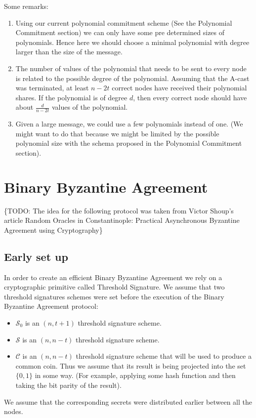 Some remarks:
\begin{enumerate}
  \item Using our current polynomial commitment scheme (See the Polynomial
    Commitment section) we can only have some pre determined sizes of
    polynomials. Hence here we should choose a minimal polynomial with degree
    larger than the size of the message. 

  \item The number of values of the polynomial that needs to be sent to every
    node is related to the possible degree of the polynomial. Assuming that
    the A-cast was terminated, at least $n-2t$ correct nodes have received their
    polynomial shares. If the polynomial is of degree $d$, then every correct
    node should have about $\frac{d}{n-2t}$ values of the polynomial.

  \item Given a large message, we could use a few polynomials instead of one.
    (We might want to do that because we might be limited by the possible
    polynomial size with the schema proposed in the Polynomial Commitment
    section).
\end{enumerate}

\section{Binary Byzantine Agreement}

\{TODO: The idea for the following protocol was taken from Victor Shoup's
article Random Oracles in Constantinople: Practical Asynchronous Byzantine
Agreement using Cryptography\}

\subsection{Early set up}
In order to create an efficient Binary Byzantine Agreement we rely on a
cryptographic primitive called Threshold Signature. We assume that two threshold
signatures schemes were set before the execution of the Binary Byzantine
Agreement protocol: 
\begin{itemize}
  \item $\mathcal{S}_0$ is an $(n,t+1)$ threshold signature scheme.
  \item $\mathcal{S}$ is an $(n,n-t)$ threshold signature scheme.
  \item $\mathcal{C}$ is an $(n,n-t)$ threshold signature scheme that will be
    used to produce a common coin. Thus we assume that its result is being
    projected into the set $\{0,1\}$ in some way. (For example, applying some
    hash function and then taking the bit parity of the result).
\end{itemize}
We assume that the corresponding secrets were distributed earlier between
all the nodes.


